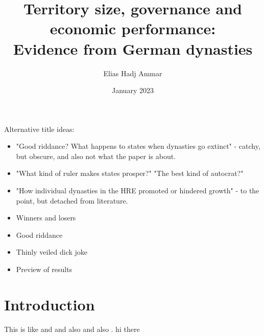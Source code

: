 \documentclass{article}
\title{Territory size, governance and economic performance: \\Evidence from German dynasties}
\author{Elias Hadj Ammar}
\date{January 2023}
\begin{document}
\maketitle
\thispagestyle{empty}
Alternative title ideas: 
\begin{itemize}
    \item "Good riddance? What happens to states when dynasties go extinct" - catchy, but obscure, and also not what the paper is about.
    \item "What kind of ruler makes states prosper?" "The best kind of autocrat?"
    \item "How individual dynasties in the HRE promoted or hindered growth" - to the point, but detached from literature.
    \item Winners and losers
    \item Good riddance
    \item Thinly veiled dick joke
    \item Preview of results
\end{itemize}

\newpage

\setcounter{page}{1}
 
\section{Introduction}

This is like \cite{as1997} and \cite{aw1998} and also \cite{as1997} and also \cite{olken2005}. hi there \cite{olken2005}

\newpage


\end{document}
